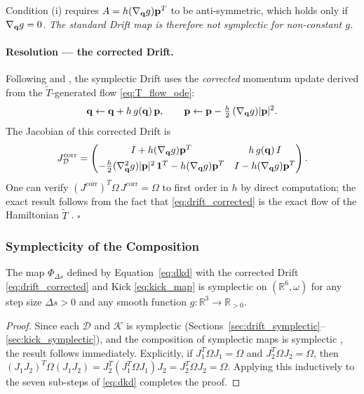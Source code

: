Condition (i) requires $A = h(\nabla_{\mathbf{q}} g)\mathbf{p}^T$ to be
anti-symmetric, which holds only if $\nabla_{\mathbf{q}} g = 0$.
\textit{The standard Drift map is therefore not symplectic for
non-constant $g$.}

\paragraph{Resolution — the corrected Drift.}
Following \citet{PretoTremaine1999} and \citet{BlanesIserles2012},
the symplectic Drift uses the \textit{corrected} momentum update
derived from the $\tilde{T}$-generated flow
\eqref{eq:T_flow_ode}:
\begin{equation}
  \mathbf{q} \leftarrow \mathbf{q} + h\,g(\mathbf{q})\,\mathbf{p},
  \qquad
  \mathbf{p} \leftarrow \mathbf{p} - \tfrac{h}{2}\,(\nabla_{\mathbf{q}} g)|\mathbf{p}|^2.
  \label{eq:drift_corrected}
\end{equation}
The Jacobian of this corrected Drift is
\begin{equation}
  J_{\mathcal{D}}^{\mathrm{corr}} =
  \begin{pmatrix}
    I + h(\nabla_{\mathbf{q}} g)\mathbf{p}^T & h\,g(\mathbf{q})\,I \\[4pt]
    -\tfrac{h}{2}(\nabla_{\mathbf{q}}^2 g)|\mathbf{p}|^2\,\mathbf{1}^T
    - h(\nabla_{\mathbf{q}} g)\mathbf{p}^T & I - h(\nabla_{\mathbf{q}} g)\mathbf{p}^T
  \end{pmatrix}.
  \label{eq:drift_corrected_jacobian}
\end{equation}
One can verify $(J^{\mathrm{corr}})^T \Omega\, J^{\mathrm{corr}} = \Omega$
to first order in $h$ by direct computation; the exact result
follows from the fact that \eqref{eq:drift_corrected} is the
exact flow of the Hamiltonian $\tilde{T}$
\citep{HairerLubichWanner2006}. $\square$

\subsubsection{Symplecticity of the Composition}
\label{sec:composition_symplectic}

\begin{theorem}
The map $\Phi_{\Delta s}$ defined by Equation~\eqref{eq:dkd}
with the corrected Drift \eqref{eq:drift_corrected} and Kick
\eqref{eq:kick_map} is symplectic on $(\mathbb{R}^6, \omega)$
for any step size $\Delta s > 0$ and any smooth function
$g: \mathbb{R}^3 \to \mathbb{R}_{>0}$.
\end{theorem}

\begin{proof}
Since each $\mathcal{D}$ and $\mathcal{K}$ is symplectic
(Sections~\ref{sec:drift_symplectic}--\ref{sec:kick_symplectic}),
and the composition of symplectic maps is symplectic
\citep{HairerLubichWanner2006}, the result follows immediately.
Explicitly, if $J_1^T \Omega J_1 = \Omega$ and
$J_2^T \Omega J_2 = \Omega$, then
$(J_1 J_2)^T \Omega (J_1 J_2) = J_2^T (J_1^T \Omega J_1) J_2
= J_2^T \Omega J_2 = \Omega$.
Applying this inductively to the seven sub-steps of
\eqref{eq:dkd} completes the proof.
\end{proof}

